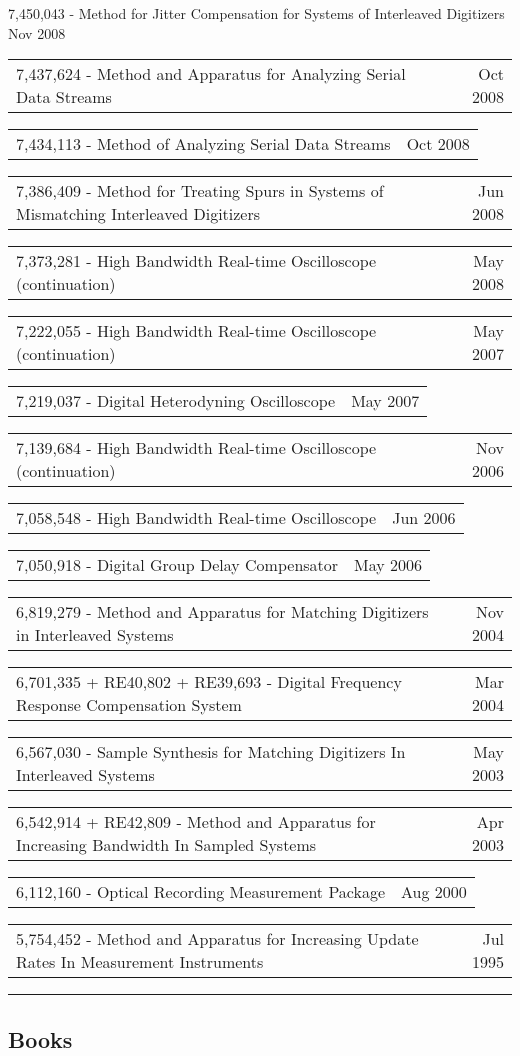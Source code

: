 \documentclass[10pt,letterpaper]{extarticle}
\makeatletter
\newcommand{\headerrow}[2]
{\begin{tabular*}{\linewidth}{l@{\extracolsep{\fill}}r}
	#1 &
	#2 \\
\end{tabular*}}
\makeatother
\begin{document}
		{7,450,043 - Method for Jitter Compensation for Systems of Interleaved Digitizers}
		{Nov 2008}
\headerrow
		{7,437,624 - Method and Apparatus for Analyzing Serial Data Streams}
		{Oct 2008}
\headerrow
		{7,434,113 - Method of Analyzing Serial Data Streams}
		{Oct 2008}
\headerrow
		{7,386,409 - Method for Treating Spurs in Systems of Mismatching Interleaved Digitizers}
		{Jun 2008}
\headerrow
		{7,373,281 - High Bandwidth Real-time Oscilloscope (continuation)}
		{May 2008}
\headerrow
		{7,222,055 - High Bandwidth Real-time Oscilloscope (continuation)}
		{May 2007}
\headerrow
		{7,219,037 - Digital Heterodyning Oscilloscope}
		{May 2007}
\headerrow
		{7,139,684 - High Bandwidth Real-time Oscilloscope (continuation)}
		{Nov 2006}
\headerrow
		{7,058,548 - High Bandwidth Real-time Oscilloscope}
		{Jun 2006}
\headerrow
		{7,050,918 - Digital Group Delay Compensator}
		{May 2006}
\headerrow
		{6,819,279 - Method and Apparatus for Matching Digitizers in Interleaved Systems}
		{Nov 2004}
\headerrow
		{6,701,335 + RE40,802 + RE39,693 - Digital Frequency Response Compensation System}
		{Mar 2004}
\headerrow
		{6,567,030 - Sample Synthesis for Matching Digitizers In Interleaved Systems}
		{May 2003}
\headerrow
		{6,542,914 + RE42,809 - Method and Apparatus for Increasing Bandwidth In Sampled Systems}
		{Apr 2003}
\headerrow
		{6,112,160 - Optical Recording Measurement Package}
		{Aug 2000}
\headerrow
		{5,754,452 - Method and Apparatus for Increasing Update Rates In Measurement Instruments}
		{Jul 1995}
\vspace{0.2em}
\clearpage
\hrule
\vspace{-1em}\subsection*{\Large Books}\vspace{-0.5em}
\end{document}
